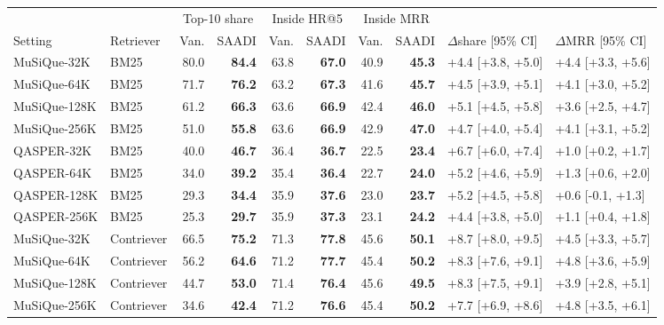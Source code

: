 \begin{table}[t]
\centering
\small
\setlength{\tabcolsep}{4pt}
\begin{tabular}{llrrrrrrll}
\toprule
 & & \multicolumn{2}{c}{Top-10 share} & \multicolumn{2}{c}{Inside HR@5} & \multicolumn{2}{c}{Inside MRR} & & \\
\cmidrule(lr){3-4}\cmidrule(lr){5-6}\cmidrule(lr){7-8}
Setting & Retriever & Van. & SAADI & Van. & SAADI & Van. & SAADI & $\Delta$share [95\% CI] & $\Delta$MRR [95\% CI] \\
\midrule
MuSiQue-32K & BM25 & 80.0 & \textbf{84.4} & 63.8 & \textbf{67.0} & 40.9 & \textbf{45.3} & +4.4 [+3.8, +5.0] & +4.4 [+3.3, +5.6] \\
MuSiQue-64K & BM25 & 71.7 & \textbf{76.2} & 63.2 & \textbf{67.3} & 41.6 & \textbf{45.7} & +4.5 [+3.9, +5.1] & +4.1 [+3.0, +5.2] \\
MuSiQue-128K & BM25 & 61.2 & \textbf{66.3} & 63.6 & \textbf{66.9} & 42.4 & \textbf{46.0} & +5.1 [+4.5, +5.8] & +3.6 [+2.5, +4.7] \\
MuSiQue-256K & BM25 & 51.0 & \textbf{55.8} & 63.6 & \textbf{66.9} & 42.9 & \textbf{47.0} & +4.7 [+4.0, +5.4] & +4.1 [+3.1, +5.2] \\
QASPER-32K & BM25 & 40.0 & \textbf{46.7} & 36.4 & \textbf{36.7} & 22.5 & \textbf{23.4} & +6.7 [+6.0, +7.4] & +1.0 [+0.2, +1.7] \\
QASPER-64K & BM25 & 34.0 & \textbf{39.2} & 35.4 & \textbf{36.4} & 22.7 & \textbf{24.0} & +5.2 [+4.6, +5.9] & +1.3 [+0.6, +2.0] \\
QASPER-128K & BM25 & 29.3 & \textbf{34.4} & 35.9 & \textbf{37.6} & 23.0 & \textbf{23.7} & +5.2 [+4.5, +5.8] & +0.6 [-0.1, +1.3] \\
QASPER-256K & BM25 & 25.3 & \textbf{29.7} & 35.9 & \textbf{37.3} & 23.1 & \textbf{24.2} & +4.4 [+3.8, +5.0] & +1.1 [+0.4, +1.8] \\
\midrule
MuSiQue-32K & Contriever & 66.5 & \textbf{75.2} & 71.3 & \textbf{77.8} & 45.6 & \textbf{50.1} & +8.7 [+8.0, +9.5] & +4.5 [+3.3, +5.7] \\
MuSiQue-64K & Contriever & 56.2 & \textbf{64.6} & 71.2 & \textbf{77.7} & 45.4 & \textbf{50.2} & +8.3 [+7.6, +9.1] & +4.8 [+3.6, +5.9] \\
MuSiQue-128K & Contriever & 44.7 & \textbf{53.0} & 71.4 & \textbf{76.4} & 45.6 & \textbf{49.5} & +8.3 [+7.5, +9.1] & +3.9 [+2.8, +5.1] \\
MuSiQue-256K & Contriever & 34.6 & \textbf{42.4} & 71.2 & \textbf{76.6} & 45.4 & \textbf{50.2} & +7.7 [+6.9, +8.6] & +4.8 [+3.5, +6.1] \\

\end{tabular}
\end{table}
